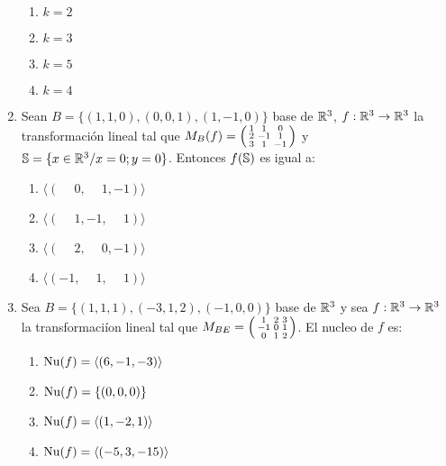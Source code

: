 \documentclass[../practica.root.tex]{subfiles}
\begin{document}
\begin{enumerate}
          \begin{enumerate}
              \item $k=2$
              \item $k=3$
              \item $k=5$
              \item $k=4$
          \end{enumerate}

          \hrulefill{}
    \item Sean $B=\{(1,1,0),(0,0,1),(1,-1,0)\}$ base de $\R^3$, $f:\R^3\to\R^3$
          la transformación lineal tal que
          $M_B(f)=\begin{psmallmatrix}1&1&0\\2&-1&1\\3&1&-1\end{psmallmatrix}$ y
          $\S=\{x\in\R^3/x=0;y=0\}$. Entonces $f(\S)$ es igual a:

          \begin{enumerate}
              \item $\langle(\phantom{-}0,\phantom{-}1,-1)\rangle$
              \item $\langle(\phantom{-}1,-1,\phantom{-}1)\rangle$
              \item $\langle(\phantom{-}2,\phantom{-}0,-1)\rangle$
              \item $\langle(-1,\phantom{-}1,\phantom{-}1)\rangle$
          \end{enumerate}

          \hrulefill{}
    \item Sea $B=\{(1,1,1),(-3,1,2),(-1,0,0)\}$ base de $\R^3$ y sea
          $f:\R^3\to\R^3$ la transformaciíon lineal tal que
          $M_{BE}=\begin{psmallmatrix}1&2&3\\-1&0&1\\0&1&2\end{psmallmatrix}$. El
          nucleo de $f$ es:

          \begin{enumerate}
              \item $\Nu(f)=\langle(6,-1,-3)\rangle$
              \item $\Nu(f)=\{(0,0,0)\}$
              \item $\Nu(f)=\langle(1,-2,1)\rangle$
              \item $\Nu(f)=\langle(-5,3,-15)\rangle$
          \end{enumerate}


\end{enumerate}
\end{document}

